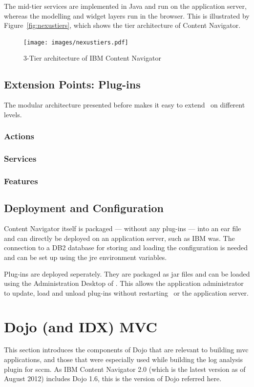 The mid-tier services are implemented in Java and run on the application server, whereas the modelling and widget layers run in the browser. This is illustrated by Figure~\ref{fig:nexustiers}, which shows the tier architecture of Content Navigator.

\begin{figure}[H]
	\centering
	\texttt{[image: images/nexustiers.pdf]}
	\caption{3-Tier architecture of IBM Content Navigator}
	\label{fig:nexuslayers}
\end{figure}

\subsection{Extension Points: Plug-ins}
The modular architecture presented before makes it easy to extend \nexus\ on different levels.

\subsubsection{Actions}
\subsubsection{Services}
\subsubsection{Features}

\subsection{Deployment and Configuration}
Content Navigator itself is packaged --- without any plug-ins --- into an \ac{ear} file and can directly be deployed on an application server, such as IBM \acl{was}. The connection to a DB2 database for storing and loading the configuration is needed and can be set up using the \ac{jre} environment variables.

Plug-ins are deployed seperately. They are packaged as \ac{jar} files and can be loaded using the Administration Desktop of \nexus. This allows the application administrator to update, load and unload plug-ins without restarting \nexus\ or the application server.

\section{Dojo (and IDX) MVC} %
This section introduces the components of Dojo that are relevant to building \acl{mvc} applications, and those that were especially used while building the log analysis plugin for \ac{sccm}. As IBM Content Navigator 2.0 (which is the latest version as of August 2012) includes Dojo 1.6, this is the version of Dojo referred here.

